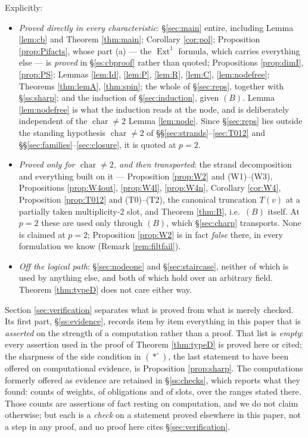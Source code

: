 \documentclass[reqno]{amsart}
\theoremstyle{plain}
\theoremstyle{definition}
\DeclareMathOperator{\Ext}{Ext}
\begin{document}
Explicitly:
\begin{itemize}\itemsep1pt
\item \emph{Proved directly in every characteristic}: \S\ref{sec:main} entire,
including Lemma \ref{lem:cb} and Theorem \ref{thm:main}; Corollary
\ref{cor:pol}; Proposition \ref{prop:Pifacts}, whose part \textup{(a)} --- the
$\Ext^1$ formula, which carries everything else --- is \emph{proved} in
\S\ref{ss:cbproof} rather than quoted; Propositions \ref{prop:dimI},
\ref{prop:PS}; Lemmas \ref{lem:Id}, \ref{lem:P}, \ref{lem:R}, \ref{lem:C},
\ref{lem:nodefree}; Theorems \ref{thm:lemA}, \ref{thm:spin}; the whole of
\S\ref{sec:reps}, together with \S\ref{ss:sharp}; and the induction of
\S\ref{sec:induction}, given $(B)$.  Lemma \ref{lem:nodefree} is what the
induction reads at the node, and is deliberately independent of the
$\operatorname{char}\ne2$ Lemma \ref{lem:node}.  Since \S\ref{sec:reps} lies
outside the standing hypothesis $\operatorname{char}\ne2$ of
\S\S\ref{sec:strands}--\ref{sec:T012} and
\S\S\ref{sec:families}--\ref{sec:closure}, it is quoted at $p=2$.
\item \emph{Proved only for $\operatorname{char}\ne2$, and then transported}:
the strand decomposition and everything built on it --- Proposition
\ref{prop:W2} and (W1)--(W3), Propositions \ref{prop:W4out}, \ref{prop:W4l},
\ref{prop:W4n}, Corollary \ref{cor:W4}, Proposition \ref{prop:T012} and
(T0)--(T2), the canonical truncation $T(v)$ at a partially taken
multiplicity-$2$ slot, and Theorem \ref{thm:B}, i.e.\ $(B)$ itself.  At $p=2$
these are used only through $(B)$, which \S\ref{sec:charp} transports.  None is
claimed at $p=2$; Proposition \ref{prop:W2} is in fact \emph{false} there, in
every formulation we know (Remark \ref{rem:filtfail}).
\item \emph{Off the logical path}: \S\ref{sec:nodeone} and
\S\ref{sec:staircase}, neither of which is used by anything else, and both of
which hold over an arbitrary field.  Theorem \ref{thm:typeD} does not care
either way.
\end{itemize}

Section \ref{sec:verification} separates what is proved from what is merely
checked.  Its first part, \S\ref{ss:evidence}, records item by item everything
in this paper that is \emph{asserted} on the strength of a computation rather
than a proof.  That list is \emph{empty}: every assertion used in the proof of
Theorem \ref{thm:typeD} is proved here or cited; the sharpness of the side
condition in $(*^\circ)$, the last statement to have been offered on
computational evidence, is Proposition \ref{prop:sharp}.  The computations
formerly offered as evidence are retained in \S\ref{ss:checks}, which reports
what they found: counts of weights, of obligations and of slots, over the
ranges stated there.  Those counts are assertions of fact resting on
computation, and we do not claim otherwise; but each is a \emph{check} on a
statement proved elsewhere in this paper, not a step in any proof, and no proof
here cites \S\ref{sec:verification}.
\end{document}
